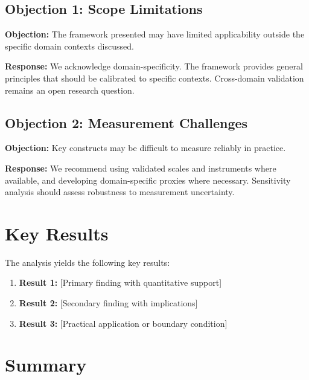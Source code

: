 \subsection{Objection 1: Scope Limitations}

\textbf{Objection:} The framework presented may have limited applicability
outside the specific domain contexts discussed.

\textbf{Response:} We acknowledge domain-specificity. The framework provides
general principles that should be calibrated to specific contexts. Cross-domain
validation remains an open research question.

\subsection{Objection 2: Measurement Challenges}

\textbf{Objection:} Key constructs may be difficult to measure reliably in
practice.

\textbf{Response:} We recommend using validated scales and instruments where
available, and developing domain-specific proxies where necessary. Sensitivity
analysis should assess robustness to measurement uncertainty.




\section{Key Results}
\label{sec:bl-results}

The analysis yields the following key results:

\begin{enumerate}
    \item \textbf{Result 1:} [Primary finding with quantitative support]
    \item \textbf{Result 2:} [Secondary finding with implications]
    \item \textbf{Result 3:} [Practical application or boundary condition]
\end{enumerate}


\section{Summary}
\label{sec:bl-summary}

